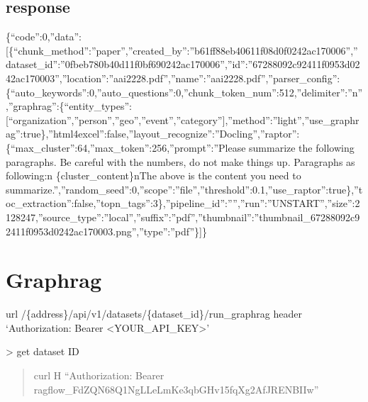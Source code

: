 \documentclass[letterpaper,10pt,english]{sphinxmanual}
\begin{document}
\section{response}
\label{\detokenize{upload-document:response}}
\sphinxAtStartPar
\{“code”:0,”data”:{[}\{“chunk\_method”:”paper”,”created\_by”:”b61ff88eb40611f08d0f0242ac170006”,”dataset\_id”:”0fbeb780b40d11f0bf690242ac170006”,”id”:”67288092c92411f0953d0242ac170003”,”location”:”aai2228.pdf”,”name”:”aai2228.pdf”,”parser\_config”:\{“auto\_keywords”:0,”auto\_questions”:0,”chunk\_token\_num”:512,”delimiter”:”n”,”graphrag”:\{“entity\_types”:{[}“organization”,”person”,”geo”,”event”,”category”{]},”method”:”light”,”use\_graphrag”:true\},”html4excel”:false,”layout\_recognize”:”Docling”,”raptor”:\{“max\_cluster”:64,”max\_token”:256,”prompt”:”Please summarize the following paragraphs. Be careful with the numbers, do not make things up. Paragraphs as following:n      \{cluster\_content\}nThe above is the content you need to summarize.”,”random\_seed”:0,”scope”:”file”,”threshold”:0.1,”use\_raptor”:true\},”toc\_extraction”:false,”topn\_tags”:3\},”pipeline\_id”:””,”run”:”UNSTART”,”size”:2128247,”source\_type”:”local”,”suffix”:”pdf”,”thumbnail”:”thumbnail\_67288092c92411f0953d0242ac170003.png”,”type”:”pdf”\}{]}\}

\sphinxstepscope


\chapter{Graphrag}
\label{\detokenize{graphrag:graphrag}}\label{\detokenize{graphrag::doc}}\begin{description}
\sphinxAtStartPar
\textendash{}url /\{address\}/api/v1/datasets/\{dataset\_id\}/run\_graphrag \textendash{}header ‘Authorization: Bearer \textless{}YOUR\_API\_KEY\textgreater{}’

\end{description}

\sphinxAtStartPar
\sphinxhyphen{}\textgreater{} get dataset ID
\begin{quote}

\sphinxAtStartPar
curl \sphinxhyphen{}H “Authorization: Bearer ragflow\sphinxhyphen{}\_FdZQN68Q1NgLLeLmKe\sphinxhyphen{}3qbGHv15fqXg2AfJRENBIIw”         
\end{quote}
\end{document}
